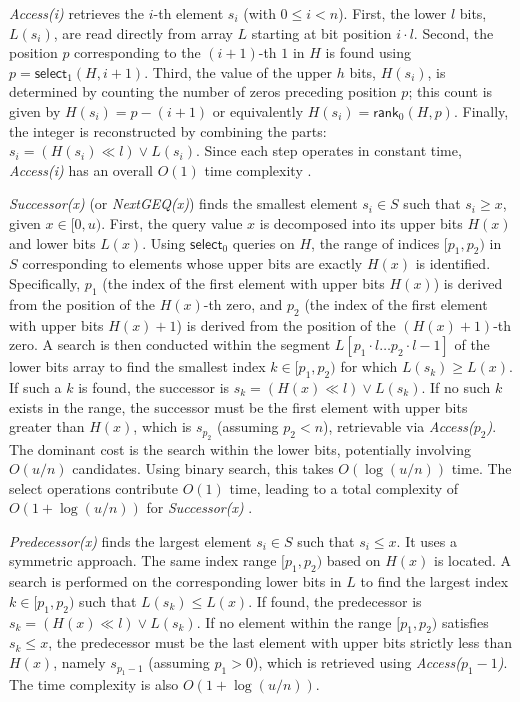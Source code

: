 \emph{Access(i)} retrieves the $i$-th element $s_i$ (with $0 \le i < n$). First, the lower $l$ bits, $L(s_i)$, are read directly from array $L$ starting at bit position $i \cdot l$. Second, the position $p$ corresponding to the $(i+1)$-th $1$ in $H$ is found using $p = \textsf{select}_1(H, i+1)$. Third, the value of the upper $h$ bits, $H(s_i)$, is determined by counting the number of zeros preceding position $p$; this count is given by $H(s_i) = p - (i+1)$ or equivalently $H(s_i) = \textsf{rank}_0(H, p)$. Finally, the integer is reconstructed by combining the parts: $s_i = (H(s_i) \ll l) \lor L(s_i)$. Since each step operates in constant time, \emph{Access(i)} has an overall $O(1)$ time complexity \cite{vigna2013quasi}.

\emph{Successor(x)} (or \emph{NextGEQ(x)}) finds the smallest element $s_i \in S$ such that $s_i \ge x$, given $x \in [0, u)$. First, the query value $x$ is decomposed into its upper bits $H(x)$ and lower bits $L(x)$. Using $\textsf{select}_0$ queries on $H$, the range of indices $[p_1, p_2)$ in $S$ corresponding to elements whose upper bits are exactly $H(x)$ is identified. Specifically, $p_1$ (the index of the first element with upper bits $H(x)$) is derived from the position of the $H(x)$-th zero, and $p_2$ (the index of the first element with upper bits $H(x)+1$) is derived from the position of the $(H(x)+1)$-th zero. A search is then conducted within the segment $L[p_1 \cdot l \dots p_2 \cdot l - 1]$ of the lower bits array to find the smallest index $k \in [p_1, p_2)$ for which $L(s_k) \ge L(x)$. If such a $k$ is found, the successor is $s_k = (H(x) \ll l) \lor L(s_k)$. If no such $k$ exists in the range, the successor must be the first element with upper bits greater than $H(x)$, which is $s_{p_2}$ (assuming $p_2 < n$), retrievable via \emph{Access($p_2$)}. The dominant cost is the search within the lower bits, potentially involving $O(u/n)$ candidates. Using binary search, this takes $O(\log(u/n))$ time. The select operations contribute $O(1)$ time, leading to a total complexity of $O(1 + \log(u/n))$ for \emph{Successor(x)} \cite{vigna2013quasi}.

\emph{Predecessor(x)} finds the largest element $s_i \in S$ such that $s_i \le x$. It uses a symmetric approach. The same index range $[p_1, p_2)$ based on $H(x)$ is located. A search is performed on the corresponding lower bits in $L$ to find the largest index $k \in [p_1, p_2)$ such that $L(s_k) \le L(x)$. If found, the predecessor is $s_k = (H(x) \ll l) \lor L(s_k)$. If no element within the range $[p_1, p_2)$ satisfies $s_k \le x$, the predecessor must be the last element with upper bits strictly less than $H(x)$, namely $s_{p_1-1}$ (assuming $p_1 > 0$), which is retrieved using \emph{Access($p_1-1$)}. The time complexity is also $O(1 + \log(u/n))$.
